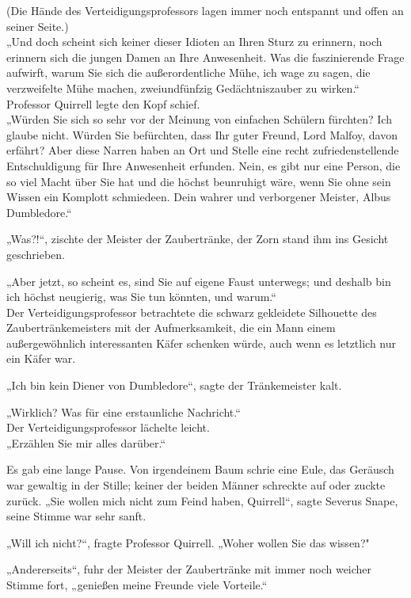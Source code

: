 {(Die Hände des Verteidigungsprofessors lagen immer noch entspannt und offen an seiner Seite.)\\ „Und doch scheint sich keiner dieser Idioten an Ihren Sturz zu erinnern, noch erinnern sich die jungen Damen an Ihre Anwesenheit. Was die faszinierende Frage aufwirft, warum Sie sich die außerordentliche Mühe, ich wage zu sagen, die verzweifelte Mühe machen, zweiundfünfzig Gedächtniszauber zu wirken.“\\ Professor Quirrell legte den Kopf schief.\\ „Würden Sie sich so sehr vor der Meinung von einfachen Schülern fürchten? Ich glaube nicht. Würden Sie befürchten, dass Ihr guter Freund, Lord Malfoy, davon erfährt? Aber diese Narren haben an Ort und Stelle eine recht zufriedenstellende Entschuldigung für Ihre Anwesenheit erfunden. Nein, es gibt nur eine Person, die so viel Macht über Sie hat und die höchst beunruhigt wäre, wenn Sie ohne sein Wissen ein Komplott schmiedeen. Dein wahrer und verborgener Meister, Albus Dumbledore.“

„Was?!“, zischte der Meister der Zaubertränke, der Zorn stand ihm ins Gesicht geschrieben.

„Aber jetzt, so scheint es, sind Sie auf eigene Faust unterwegs; und deshalb bin ich höchst neugierig, was Sie tun könnten, und warum.“\\ Der Verteidigungsprofessor betrachtete die schwarz gekleidete Silhouette des Zaubertränkemeisters mit der Aufmerksamkeit, die ein Mann einem außergewöhnlich interessanten Käfer schenken würde, auch wenn es letztlich nur ein Käfer war.

„Ich bin kein Diener von Dumbledore“, sagte der Tränkemeister kalt.

„Wirklich? Was für eine erstaunliche Nachricht.“\\ Der Verteidigungsprofessor lächelte leicht.\\ „Erzählen Sie mir alles darüber.“

Es gab eine lange Pause. Von irgendeinem Baum schrie eine Eule, das Geräusch war gewaltig in der Stille; keiner der beiden Männer schreckte auf oder zuckte zurück. „Sie wollen mich nicht zum Feind haben, Quirrell“, sagte Severus Snape, seine Stimme war sehr sanft.

„Will ich nicht?“, fragte Professor Quirrell. „Woher wollen Sie das wissen?"

„Andererseits“, fuhr der Meister der Zaubertränke mit immer noch weicher Stimme fort, „genießen meine Freunde viele Vorteile.“

}
